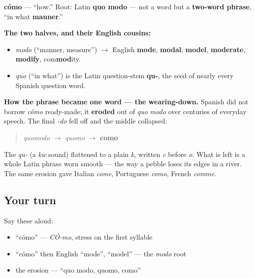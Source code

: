 \begin{cousinweb}
\textbf{cómo} — \textquotedblleft{}how.\textquotedblright{} Root: Latin \textbf{quo modo} — not a word but a \textbf{two-word phrase}, \textquotedblleft{}in what \textbf{manner}.\textquotedblright{}

\textbf{The two halves, and their English cousins:}

\begin{itemize}
\raggedright
  \item \emph{modo} (\textquotedblleft{}manner, measure\textquotedblright{}) $\to$ English \textbf{mode}, \textbf{modal}, \textbf{model}, \textbf{moderate}, \textbf{modify}, com\textbf{mod}ity.
  \item \emph{quo} (\textquotedblleft{}in what\textquotedblright{}) is the Latin question-stem \textbf{qu-}, the seed of nearly every Spanish question word.
\end{itemize}

\textbf{How the phrase became one word — the wearing-down.} Spanish did not borrow \emph{cómo} ready-made; it \textbf{eroded} out of \emph{quo modo} over centuries of everyday speech. The final \emph{-do} fell off and the middle collapsed:

\begin{quote}
\emph{quomodo} $\to$ \emph{quomo} $\to$ \textbf{como}
\end{quote}

The \emph{qu-} (a \emph{kw} sound) flattened to a plain \emph{k}, written \emph{c} before \emph{o}. What is left is a whole Latin phrase worn smooth — the way a pebble loses its edges in a river. The same erosion gave Italian \emph{come}, Portuguese \emph{como}, French \emph{comme}.
\end{cousinweb}

\subsection*{Your turn}
Say these aloud:

\begin{itemize}
\raggedright
  \item \textquotedblleft{}cómo\textquotedblright{} — \emph{CÓ-mo}, stress on the first syllable
  \item \textquotedblleft{}cómo\textquotedblright{} then English \textquotedblleft{}mode\textquotedblright{}, \textquotedblleft{}model\textquotedblright{} — the \emph{modo} root
  \item the erosion — \textquotedblleft{}quo modo, quomo, como\textquotedblright{}
\end{itemize}

